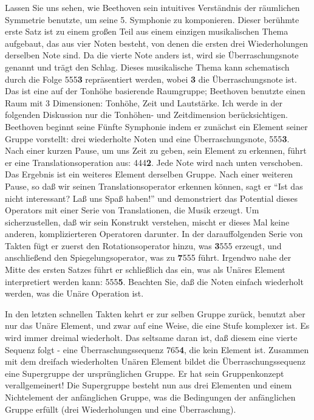 Lassen Sie uns sehen, wie Beethoven sein intuitives Verständnis der räumlichen Symmetrie benutzte, um seine 5. Symphonie zu komponieren.
Dieser berühmte erste Satz ist zu einem großen Teil aus einem einzigen musikalischen Thema aufgebaut, das aus vier Noten besteht, von denen die ersten drei Wiederholungen derselben Note sind.
Da die vierte Note anders ist, wird sie Überraschungsnote genannt und trägt den Schlag.
Dieses musikalische Thema kann schematisch durch die Folge 555\textbf{3} repräsentiert werden, wobei \textbf{3} die Überraschungsnote ist.
Das ist eine auf der Tonhöhe basierende Raumgruppe; Beethoven benutzte einen Raum mit 3 Dimensionen: Tonhöhe, Zeit und Lautstärke.
Ich werde in der folgenden Diskussion nur die Tonhöhen- und Zeitdimension berücksichtigen.
Beethoven beginnt seine Fünfte Symphonie indem er zunächst ein Element seiner Gruppe vorstellt: drei wiederholte Noten und eine Überraschungsnote, 555\textbf{3}.
Nach einer kurzen Pause, um uns Zeit zu geben, sein Element zu erkennen, führt er eine Translationsoperation aus: 444\textbf{2}.
Jede Note wird nach unten verschoben.
Das Ergebnis ist ein weiteres Element derselben Gruppe.
Nach einer weiteren Pause, so daß wir seinen Translationsoperator erkennen können, sagt er \enquote{Ist das nicht interessant? Laß uns Spaß haben!} und demonstriert das Potential dieses Operators mit einer Serie von Translationen, die Musik erzeugt.
Um sicherzustellen, daß wir sein Konstrukt verstehen, mischt er dieses Mal keine anderen, komplizierteren Operatoren darunter.
In der darauffolgenden Serie von Takten fügt er zuerst den Rotationsoperator hinzu, was \textbf{3}555 erzeugt, und anschließend den Spiegelungsoperator, was zu \textbf{7}555 führt.
Irgendwo nahe der Mitte des ersten Satzes führt er schließlich das ein, was als Unäres Element interpretiert werden kann: 555\textbf{5}.
Beachten Sie, daß die Noten einfach wiederholt werden, was die Unäre Operation ist.

In den letzten schnellen Takten kehrt er zur selben Gruppe zurück, benutzt aber nur das Unäre Element, und zwar auf eine Weise, die eine Stufe komplexer ist.
Es wird immer dreimal wiederholt.
Das seltsame daran ist, daß diesem eine vierte Sequenz folgt - eine Überraschungssequenz 765\textbf{4}, die kein Element ist.
Zusammen mit dem dreifach wiederholten Unären Element bildet die Überraschungssequenz eine Supergruppe der ursprünglichen Gruppe.
Er hat sein Gruppenkonzept verallgemeinert!
Die Supergruppe besteht nun aus drei Elementen und einem Nichtelement der anfänglichen Gruppe, was die Bedingungen der anfänglichen Gruppe erfüllt (drei Wiederholungen und eine Überraschung).

